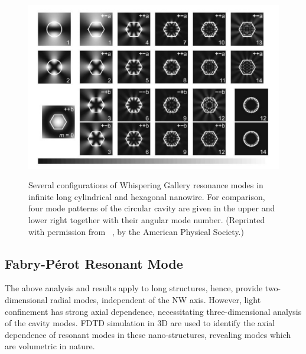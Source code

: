 \begin{figure}
  \caption{Several configurations of Whispering Gallery resonance modes in infinite long cylindrical and hexagonal nanowire. For comparison, four mode patterns of the circular cavity are given in the upper and lower right together with their angular mode number. (Reprinted with permission from~\cite{Nobis:2005wg} ,  by the American Physical Society.)}
  \centering
  \includegraphics[width=\textwidth]{pictures/LM/WGMode}
  \label{WGMode}
\end{figure}

\subsection{Fabry-P{\'e}rot Resonant Mode}

The above analysis and results apply to long structures, hence, provide
two-dimensional radial modes, independent of the NW axis. However, light
confinement has strong axial dependence, necessitating three-dimensional
analysis of the cavity modes. FDTD simulation in 3D are used to identify the
axial dependence of resonant modes in these nano-structures, revealing modes
which are volumetric in nature.

